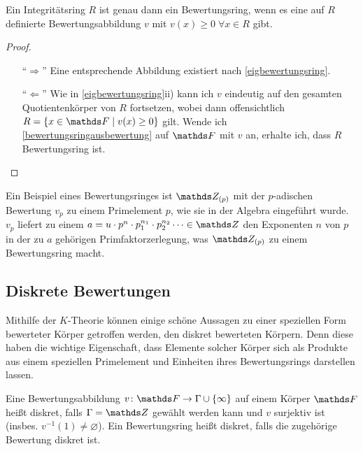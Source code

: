 \documentclass[ngerman,fontsize=11pt, paper=a4, parskip=half, titlepage=true, toc=bib]{scrartcl}
\begin{document}
\begin{Kor}
  Ein Integritätsring $R$ ist genau dann ein Bewertungsring, wenn es
  eine auf $R$ definierte Bewertungsabbildung $v$ mit $v(x)\geq
  0\;\forall x\in R$ gibt.
  \begin{proof}
    \begin{itemize}
    \item[\enquote{$\Rightarrow$}] Eine entsprechende Abbildung
      existiert nach \ref{eigbewertungsring}.
    \item[\enquote{$\Leftarrow$}] Wie in \ref{eigbewertungsring}ii)
      kann ich $v$ eindeutig auf den gesamten Quotientenkörper von
      $R$ fortsetzen, wobei dann offensichtlich $R=\{x\in\F\mid
      v(x)\geq 0\}$ gilt. Wende ich \ref{bewertungsringausbewertung}
      auf $\F$ mit $v$ an, erhalte ich, dass $R$ Bewertungsring ist.
    \end{itemize}
  \end{proof}
\end{Kor}

\begin{Bsp}
  Ein Beispiel eines Bewertungsringes ist $\Z_{(p)}$ mit der $p$-adischen
  Bewertung $v_p$ zu einem Primelement $p$, 
  wie sie in der Algebra eingeführt wurde.
  $v_p$ liefert zu einem 
  $a=u\cdot p^{n}\cdot p_1^{n_1}\cdot p_2^{n_2}\dotsm\in\Z $ 
  den Exponenten $n$ von $p$ in der zu $a$ gehörigen Primfaktorzerlegung,
  was $\Z_{(p)}$ zu einem Bewertungsring macht.
\end{Bsp}

\subsection{Diskrete Bewertungen}
Mithilfe der $K$-Theorie können einige schöne Aussagen zu einer
speziellen Form bewerteter Körper getroffen werden, den diskret
bewerteten Körpern. Denn diese haben die wichtige Eigenschaft, 
dass Elemente solcher Körper sich als Produkte aus einem speziellen
Primelement und Einheiten ihres Bewertungsrings darstellen lassen.

\begin{Def}
  Eine Bewertungsabbildung $v\colon\F\to\Gamma\cup\{\infty\}$
  auf einem Körper $\F$ heißt diskret, falls $\Gamma=\Z$ gewählt
  werden kann und $v$ surjektiv ist (insbes. $v^{-1}(1)\neq \varnothing$).
  Ein Bewertungsring heißt diskret, falls die zugehörige Bewertung
  diskret ist.
\end{Def}
\end{document}
